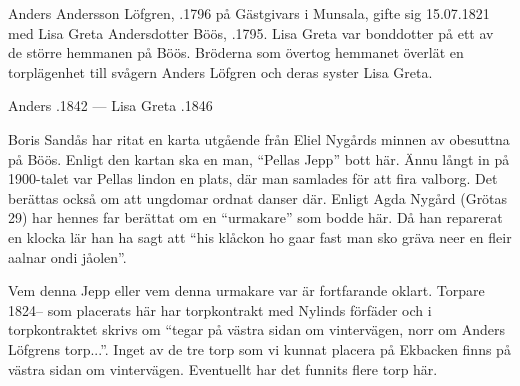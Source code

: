 Anders Andersson Löfgren, .1796 på Gästgivars i Munsala, gifte sig 15.07.1821 med Lisa Greta Andersdotter Böös, .1795. Lisa Greta var bonddotter på ett av de större hemmanen på Böös. Bröderna som övertog hemmanet överlät en torplägenhet till svågern Anders Löfgren och deras syster Lisa Greta.
\begin{jhchildren}
  \item {}
  \item {}
  \item {}
  \item {}
  \item {}
  \item {}
\end{jhchildren}
Anders .1842  ---  Lisa Greta .1846




Boris Sandås har ritat en karta utgående från Eliel Nygårds minnen av obesuttna på Böös. Enligt den kartan ska en man, ``Pellas Jepp'' bott här. Ännu långt in på 1900-talet var Pellas lindon en plats, där man samlades för att fira valborg. Det berättas också om att ungdomar ordnat danser där. Enligt Agda Nygård (Grötas 29) har hennes far berättat om en ``urmakare'' som bodde här. Då han reparerat en klocka lär han ha sagt att ``his klåckon ho gaar fast man sko gräva neer en fleir aalnar ondi jåolen''.

Vem denna Jepp eller vem denna urmakare var är fortfarande oklart. Torpare 1824-- som placerats här har torpkontrakt med Nylinds förfäder och i torpkontraktet skrivs om ``tegar på västra sidan om 	vintervägen, norr om Anders Löfgrens torp...''. Inget av de tre torp som vi kunnat placera på Ekbacken finns på västra sidan om vintervägen. Eventuellt har det funnits flere torp här.


